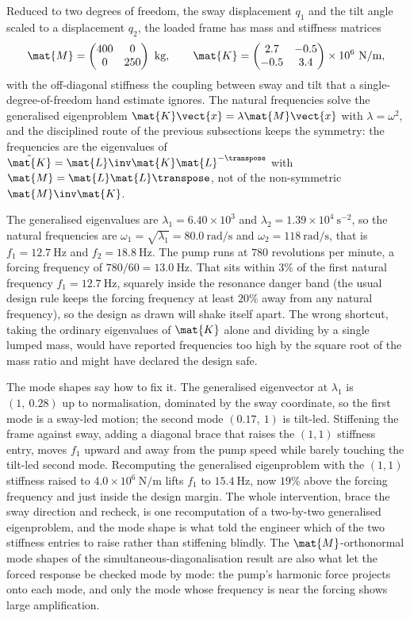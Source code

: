 Reduced to two degrees of freedom, the sway displacement $q_1$ and the
tilt angle scaled to a displacement $q_2$, the loaded frame has mass
and stiffness matrices
\[
\mat{M} = \begin{pmatrix} 400 & 0 \\ 0 & 250 \end{pmatrix}\ \text{kg},
\qquad
\mat{K} = \begin{pmatrix} 2.7 & -0.5 \\ -0.5 & 3.4 \end{pmatrix}
\times 10^{6}\ \text{N/m},
\]
with the off-diagonal stiffness the coupling between sway and tilt that
a single-degree-of-freedom hand estimate ignores. The natural
frequencies solve the generalised eigenproblem $\mat{K}\vect{x} =
\lambda\mat{M}\vect{x}$ with $\lambda = \omega^{2}$, and the
disciplined route of the previous subsections keeps the symmetry: the
frequencies are the eigenvalues of $\tilde{\mat{K}} = \mat{L}\inv\mat{K}
\mat{L}^{-\transpose}$ with $\mat{M} = \mat{L}\mat{L}\transpose$, not
of the non-symmetric $\mat{M}\inv\mat{K}$.

The generalised eigenvalues are $\lambda_1 = 6.40 \times 10^{3}$ and
$\lambda_2 = 1.39 \times 10^{4}\ \text{s}^{-2}$, so the natural
frequencies are $\omega_1 = \sqrt{\lambda_1} = 80.0\ \text{rad/s}$ and
$\omega_2 = 118\ \text{rad/s}$, that is $f_1 = 12.7\ \text{Hz}$ and
$f_2 = 18.8\ \text{Hz}$. The pump runs at $780$ revolutions per minute,
a forcing frequency of $780/60 = 13.0\ \text{Hz}$. That sits within
$3\%$ of the first natural frequency $f_1 = 12.7\ \text{Hz}$, squarely
inside the resonance danger band (the usual design rule keeps the
forcing frequency at least $20\%$ away from any natural frequency), so
the design as drawn will shake itself apart. The wrong shortcut, taking
the ordinary eigenvalues of $\mat{K}$ alone and dividing by a single
lumped mass, would have reported frequencies too high by the square
root of the mass ratio and might have declared the design safe.

The mode shapes say how to fix it. The generalised eigenvector at
$\lambda_1$ is $(1,\ 0.28)$ up to normalisation, dominated by the sway
coordinate, so the first mode is a sway-led motion; the second mode
$(0.17,\ 1)$ is tilt-led. Stiffening the frame against sway, adding a
diagonal brace that raises the $(1,1)$ stiffness entry, moves $f_1$
upward and away from the pump speed while barely touching the tilt-led
second mode. Recomputing the generalised eigenproblem with the $(1,1)$
stiffness raised to $4.0 \times 10^{6}\ \text{N/m}$ lifts $f_1$ to
$15.4\ \text{Hz}$, now $19\%$ above the forcing frequency and just
inside the design margin. The whole intervention, brace the sway
direction and recheck, is one recomputation of a two-by-two generalised
eigenproblem, and the mode shape is what told the engineer which of the
two stiffness entries to raise rather than stiffening blindly. The
$\mat{M}$-orthonormal mode shapes of the simultaneous-diagonalisation
result are also what let the forced response be checked mode by mode:
the pump's harmonic force projects onto each mode, and only the mode
whose frequency is near the forcing shows large amplification.

